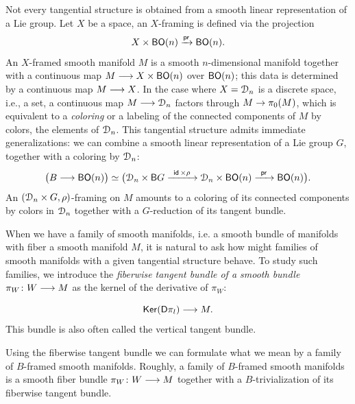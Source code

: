 \begin{example}
    Not every tangential structure is obtained from a smooth linear representation of a Lie group. Let $X$ be a space, an $X$-framing is defined via the projection 
    \begin{equation}
        X \times \mathsf B\mathsf O(n) \xrightarrow{\sf pr} \mathsf B\mathsf O(n).
    \end{equation}
    An $X$-framed smooth manifold $M$ is a smooth $n$-dimensional manifold together with a continuous map $M \longrightarrow X \times \mathsf B\mathsf O(n)$ over $\mathsf B\mathsf O(n)$; this data is determined by a continuous map $M \longrightarrow X$. In the case where $X = \mathcal D_n$ is a discrete space, i.e., a set, a continuous map $M \longrightarrow \mathcal D_n$ factors through $M \rightarrow \pi_{0}(M)$, which is equivalent to a \emph{coloring} or a labeling of the connected components of $M$ by colors, the elements of $\mathcal D_n$. This tangential structure admits immediate generalizations: we can combine a smooth linear representation of a Lie group $G$, together with a coloring by $\mathcal D_n$:
    \begin{equation}
        \big(B \longrightarrow \mathsf B\mathsf O(n)\big) \simeq \big(\mathcal D_{n}\times \mathsf B G \xrightarrow{\,\,\, \operatorname{\sf id} \times \rho\,\,\,} \mathcal D_{n}\times \mathsf B \mathsf O(n) \xrightarrow{\,\,\,\mathsf{pr}\,\,\,} \mathsf B\mathsf O(n)\big).
    \end{equation}
    An $(\mathcal D_n\times G,\rho)$-framing on $M$ amounts to a coloring of its connected components by colors in $\mathcal D_n$ together with a $G$-reduction of its tangent bundle.
\end{example}

When we have a family of smooth manifolds, i.e. a smooth bundle of manifolds with fiber a smooth manifold $M$, it is natural to ask how might families of smooth manifolds with a given tangential structure behave. To study such families, we introduce the \emph{fiberwise tangent bundle of a smooth bundle $\pi_W\colon W \longrightarrow M$} as the kernel of the derivative of $\pi_W$:

\begin{equation}
    \mathsf{Ker}(\mathsf D\pi_{l}) \longrightarrow M.
\end{equation}
This bundle is also often called the vertical tangent bundle.

Using the fiberwise tangent bundle we can formulate what we mean by a family of $B$-framed smooth manifolds. Roughly, a family of $B$-framed smooth manifolds is a smooth fiber bundle $\pi_W \colon W \longrightarrow M$ together with a $B$-trivialization of its fiberwise tangent bundle.

